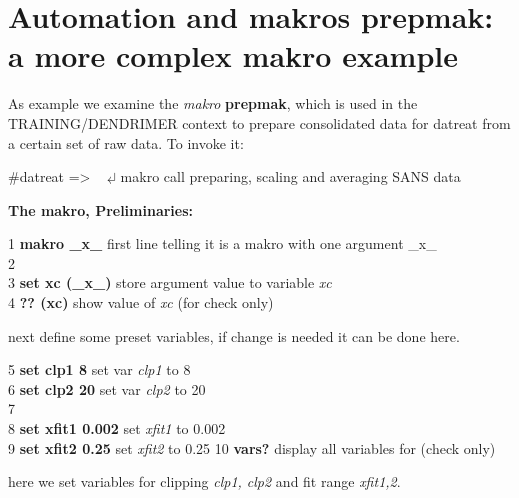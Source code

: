\documentclass[11pt,fleqn]{book} %
\newcommand{\linespace}{\vspace{4ex}}
\newcommand{\return}{$\carriagereturn$} %
\newcommand{\sysprompt}{{\color{green}...\textgreater} ~ }
\newcommand{\dtrprompt}{{\color{blue}\#datreat =\textgreater} ~ }
\newcommand{\enter}[1]{{\color{red} \bf #1}}
\newcommand{\cmdl}[2]{{\color{red}{\bf \underline{#1} #2}}}
\newcommand{\desc}[1]{\hskip 0.5cm {\color{descgray} #1}}
\newcommand{\expl}[1]{\hskip 0.5cm {\color{explgray} #1}}
\begin{document}
\section{Automation and makros \desc{prepmak: a more complex makro example}}
As example we examine the \emph{makro} {\bf prepmak}, which is used in the TRAINING/DENDRIMER context
to prepare consolidated data for datreat from a certain set of raw data.
To invoke it:
\begin{corollary}
\dtrprompt \cmdl{prepmak}{0.1} \return \expl{makro call preparing, scaling and averaging SANS data}
\end{corollary}

\linespace

{\bf The makro, Preliminaries:}
\begin{corollary}
1 {\bf makro \_x\_ }  \expl{first line telling it is a makro with one argument \_x\_} \\
2 \\
3 {\bf set xc (\_x\_)} \expl{store argument value to variable \emph{xc}} \\
4 {\bf ?? (xc) } \expl{show value of \emph{xc} (for check only)}
\end{corollary}

next define some preset variables, if change is needed it can be done here.

\begin{corollary}
5 {\bf set clp1 8 }  \expl{set var \emph{clp1} to 8 } \\
6 {\bf set clp2 20 }  \expl{set var \emph{clp2} to 20} \\
7 \\
8 {\bf set xfit1 0.002} \expl{set \emph{xfit1} to 0.002 } \\
9 {\bf set xfit2 0.25 } \expl{set \emph{xfit2} to 0.25}
10 {\bf vars? } \expl{display all variables for (check only)}
\end{corollary}

here we set variables for clipping \emph{clp1, clp2} and fit range \emph{xfit1,2}.
\end{document}
